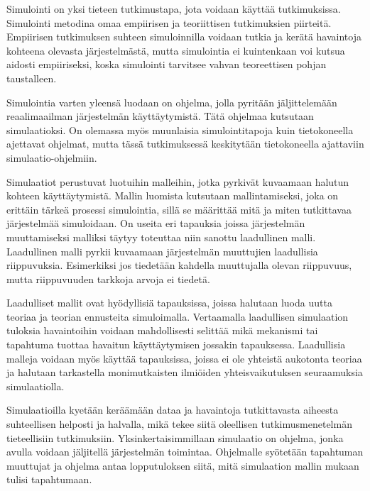 \documentclass[utf8]{gradu3}
\begin{document}
Simulointi on yksi tieteen tutkimustapa, jota voidaan käyttää tutkimuksissa.
Simulointi metodina omaa empiirisen ja teoriittisen tutkimuksien piirteitä.
Empiirisen tutkimuksen suhteen simuloinnilla voidaan tutkia ja kerätä havaintoja
kohteena olevasta järjestelmästä, mutta simulointia ei 
kuintenkaan voi kutsua aidosti empiiriseksi,
koska simulointi tarvitsee vahvan teoreettisen pohjan taustalleen.
\begin{comment}
Olisiko vielä oleellisempaa, että simulointi ei ole suoraan kytköksissä siihen todellisuuteen, jota esittäviä tuloksia lopulta haetaan. Tämä riippumatta siitä, onko malli tiukan teoreettinen (ab initio) vai fenomenologinen sisältäen yksinkertaistuksia ja sovitteita.
\end{comment}
Simulointia varten yleensä luodaan on ohjelma, 
jolla pyritään jäljittelemään reaalimaailman järjestelmän käyttäytymistä.
Tätä ohjelmaa kutsutaan simulaatioksi.
On olemassa myös muunlaisia simulointitapoja kuin tietokoneella ajettavat ohjelmat, mutta 
tässä tutkimuksessä keskitytään tietokoneella ajattaviin simulaatio-ohjelmiin.

Simulaatiot perustuvat luotuihin malleihin, 
jotka pyrkivät kuvaamaan halutun kohteen käyttäytymistä. 
Mallin luomista kutsutaan mallintamiseksi, joka on erittäin tärkeä prosessi simulointia,
sillä se määrittää mitä ja miten tutkittavaa järjestelmää simuloidaan. 
On useita eri tapauksia joissa järjestelmän muuttamiseksi malliksi 
täytyy toteuttaa niin sanottu laadullinen malli. 
Laadullinen malli pyrkii kuvaamaan järjestelmän muuttujien laadullisia riippuvuksia.
Esimerkiksi jos tiedetään kahdella muuttujalla olevan riippuvuus, mutta riippuvuuden 
tarkkoja arvoja ei tiedetä.

Laadulliset mallit ovat hyödyllisiä tapauksissa, joissa halutaan luoda uutta teoriaa ja teorian ennusteita simuloimalla. Vertaamalla laadullisen simulaation tuloksia havaintoihin 
voidaan mahdollisesti selittää mikä mekanismi tai tapahtuma tuottaa havaitun käyttäytymisen jossakin tapauksessa.
Laadullisia malleja voidaan myös käyttää tapauksissa, joissa ei ole yhteistä aukotonta teoriaa ja halutaan tarkastella monimutkaisten ilmiöiden yhteisvaikutuksen seuraamuksia simulaatiolla.

Simulaatioilla kyetään keräämään dataa ja havaintoja tutkittavasta aiheesta suhteellisen helposti ja halvalla, mikä tekee siitä oleellisen tutkimusmenetelmän tieteellisiin tutkimuksiin. Yksinkertaisimmillaan simulaatio on ohjelma, jonka avulla voidaan jäljitellä järjestelmän toimintaa. Ohjelmalle syötetään tapahtuman muuttujat ja ohjelma antaa lopputuloksen siitä, mitä simulaation mallin mukaan tulisi tapahtumaan. 
\end{document}
